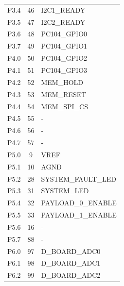 \begin{table}[!h]
\begin{tabular}{lcl}
        P3.4              & 46                  & I2C1\_READY           \\
        P3.5              & 47                  & I2C2\_READY           \\
        P3.6              & 48                  & PC104\_GPIO0          \\
        P3.7              & 49                  & PC104\_GPIO1          \\
        \midrule
        P4.0              & 50                  & PC104\_GPIO2          \\
        P4.1              & 51                  & PC104\_GPIO3          \\
        P4.2              & 52                  & MEM\_HOLD             \\
        P4.3              & 53                  & MEM\_RESET            \\
        P4.4              & 54                  & MEM\_SPI\_CS          \\
        P4.5              & 55                  & -                     \\
        P4.6              & 56                  & -                     \\
        P4.7              & 57                  & -                     \\
        \midrule
        P5.0              & 9                   & VREF                  \\
        P5.1              & 10                  & AGND                  \\
        P5.2              & 28                  & SYSTEM\_FAULT\_LED    \\
        P5.3              & 31                  & SYSTEM\_LED           \\
        P5.4              & 32                  & PAYLOAD\_0\_ENABLE    \\
        P5.5              & 33                  & PAYLOAD\_1\_ENABLE    \\
        P5.6              & 16                  & -                     \\
        P5.7              & 88                  & -                     \\
        \midrule
        P6.0              & 97                  & D\_BOARD\_ADC0        \\
        P6.1              & 98                  & D\_BOARD\_ADC1        \\
        P6.2              & 99                  & D\_BOARD\_ADC2        \\

\end{tabular}
\end{table}
